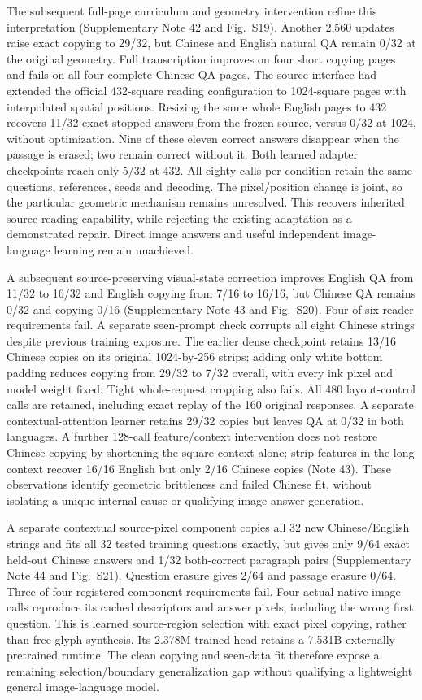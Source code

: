 The subsequent full-page curriculum and geometry intervention refine this
interpretation (Supplementary Note 42 and Fig.~S19). Another 2,560 updates
raise exact copying to 29/32, but Chinese and English natural QA remain 0/32
at the original geometry. Full transcription improves on four short copying
pages and fails on all four complete Chinese QA pages. The source interface
had extended the official 432-square reading configuration to 1024-square
pages with interpolated spatial positions. Resizing the same whole English
pages to 432 recovers 11/32 exact stopped answers from the frozen source,
versus 0/32 at 1024, without optimization. Nine of these eleven correct
answers disappear when the passage is erased; two remain correct without it.
Both learned adapter checkpoints reach only 5/32 at 432. All eighty calls per
condition retain the same questions, references, seeds and decoding. The
pixel/position change is joint, so the particular geometric mechanism remains
unresolved. This recovers inherited source reading capability, while rejecting
the existing adaptation as a demonstrated repair. Direct image answers and
useful independent image-language learning remain unachieved.

A subsequent source-preserving visual-state correction improves English QA from 11/32 to 16/32 and English copying from 7/16 to 16/16, but Chinese QA remains 0/32 and copying 0/16 (Supplementary Note 43 and Fig.~S20). Four of six reader requirements fail. A separate seen-prompt check corrupts all eight Chinese strings despite previous training exposure. The earlier dense checkpoint retains 13/16 Chinese copies on its original 1024-by-256 strips; adding only white bottom padding reduces copying from 29/32 to 7/32 overall, with every ink pixel and model weight fixed. Tight whole-request cropping also fails. All 480 layout-control calls are retained, including exact replay of the 160 original responses. A separate contextual-attention learner retains 29/32 copies but leaves QA at 0/32 in both languages. A further 128-call feature/context intervention does not restore Chinese copying by shortening the square context alone; strip features in the long context recover 16/16 English but only 2/16 Chinese copies (Note 43). These observations identify geometric brittleness and failed Chinese fit, without isolating a unique internal cause or qualifying image-answer generation.

A separate contextual source-pixel component copies all 32 new Chinese/English
strings and fits all 32 tested training questions exactly, but gives only
9/64 exact held-out Chinese answers and 1/32 both-correct paragraph pairs
(Supplementary Note 44 and Fig.~S21). Question erasure gives 2/64 and passage
erasure 0/64. Three of four registered component requirements fail. Four
actual native-image calls reproduce its cached descriptors and answer pixels,
including the wrong first question. This is learned source-region selection
with exact pixel copying, rather than free glyph synthesis. Its 2.378M trained
head retains a 7.531B externally pretrained runtime. The clean copying and
seen-data fit therefore expose a remaining selection/boundary generalization
gap without qualifying a lightweight general image-language model.

